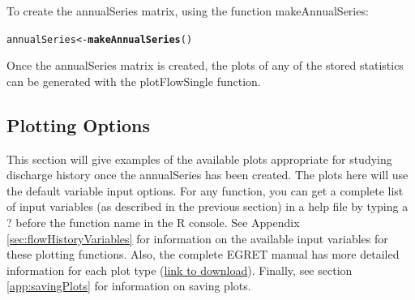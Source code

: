 \documentclass[a4paper,11pt]{article}\usepackage[]{graphicx}\usepackage[]{color}
\makeatletter
\newcommand{\hlstd}[1]{\textcolor[rgb]{0.345,0.345,0.345}{#1}}%
\newcommand{\hlkwb}[1]{\textcolor[rgb]{0.69,0.353,0.396}{#1}}%
\newcommand{\hlkwd}[1]{\textcolor[rgb]{0.737,0.353,0.396}{\textbf{#1}}}%
\newenvironment{kframe}{%
 \def\at@end@of@kframe{}%
 \ifinner\ifhmode%
  \def\at@end@of@kframe{\end{minipage}}%
  \begin{minipage}{\columnwidth}%
 \fi\fi%
 \def\FrameCommand##1{\hskip\@totalleftmargin \hskip-\fboxsep
 \colorbox{shadecolor}{##1}\hskip-\fboxsep
     \hskip-\linewidth \hskip-\@totalleftmargin \hskip\columnwidth}%
 \MakeFramed {\advance\hsize-\width
   \@totalleftmargin\z@ \linewidth\hsize
   \@setminipage}}%
 {\par\unskip\endMakeFramed%
 \at@end@of@kframe}
\newenvironment{knitrout}{}{} %
\makeatother
\begin{document}
To create the annualSeries matrix, using the function makeAnnualSeries:
\begin{knitrout}
\color{fgcolor}\begin{kframe}
\begin{alltt}
\hlstd{annualSeries} \hlkwb{<-} \hlkwd{makeAnnualSeries}\hlstd{()}
\end{alltt}
\end{kframe}
\end{knitrout}


Once the annualSeries matrix is created, the plots of any of the stored statistics can be generated with the plotFlowSingle function.

\FloatBarrier

\subsection{Plotting Options}
\label{sec:plotOptions}

\FloatBarrier

This section will give examples of the available plots appropriate for studying discharge history once the annualSeries has been created. The plots here will use the default variable input options.  For any function, you can get a complete list of input variables (as described in the previous section) in a help file by typing a ? before the function name in the R console. See Appendix \ref{sec:flowHistoryVariables} for information on the available input variables for these plotting functions. Also, the complete EGRET manual has more detailed information for each plot type (\href{https://github.com/USGS-R/EGRET/raw/Documentation/EGRET%2Bmanual_4.doc}{link to download}). Finally, see section \ref{app:savingPlots} for information on saving plots.
\end{document}
